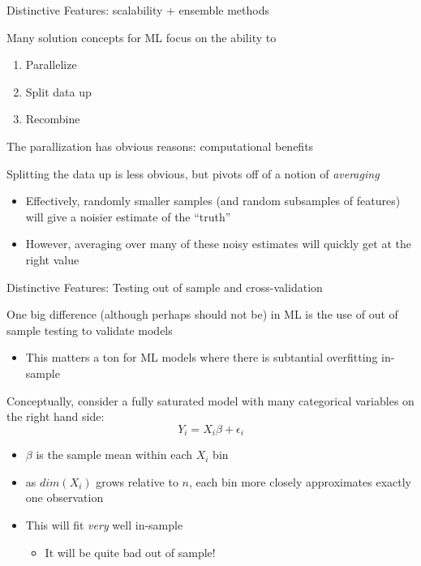 \documentclass[notes,11pt, aspectratio=169]{beamer}
\newenvironment{wideitemize}{\itemize\addtolength{\itemsep}{10pt}}{\enditemize}
\begin{document}
\begin{frame}{Distinctive Features: scalability + ensemble methods}
  \begin{wideitemize}
  \item Many solution concepts for ML focus on the ability to
    \begin{enumerate}
    \item Parallelize
    \item Split data up
    \item Recombine
    \end{enumerate}
  \item The parallization has obvious reasons: computational benefits
  \item Splitting the data up is less obvious, but pivots off of a
    notion of \emph{averaging}
    \begin{itemize}
    \item Effectively, randomly smaller samples (and random subsamples
      of features) will give a noisier estimate of the ``truth''
    \item However, averaging over many of these noisy estimates will
      quickly get at the right value
    \end{itemize}
  \end{wideitemize}
\end{frame}

\begin{frame}{Distinctive Features: Testing out of sample and cross-validation}
  \begin{wideitemize}
  \item One big difference (although perhaps should not be) in ML is
    the use of out of sample testing to validate models
    \begin{itemize}
    \item This matters a ton for ML models where there is subtantial overfitting in-sample
    \end{itemize}
  \item Conceptually, consider a fully saturated model with many
    categorical variables on the right hand side:
    $$Y_{i} = X_{i}\beta + \epsilon_{i}$$
    \begin{itemize}
    \item $\beta$ is the sample mean within each $X_{i}$ bin
    \item as $dim(X_{i})$ grows relative to $n$, each bin more closely
      approximates exactly one observation
    \item This will fit \emph{very} well in-sample
      \begin{itemize}
      \item It will be quite bad out of sample!
      \end{itemize}
    \end{itemize}
  \end{wideitemize}
\end{frame}
\end{document}
